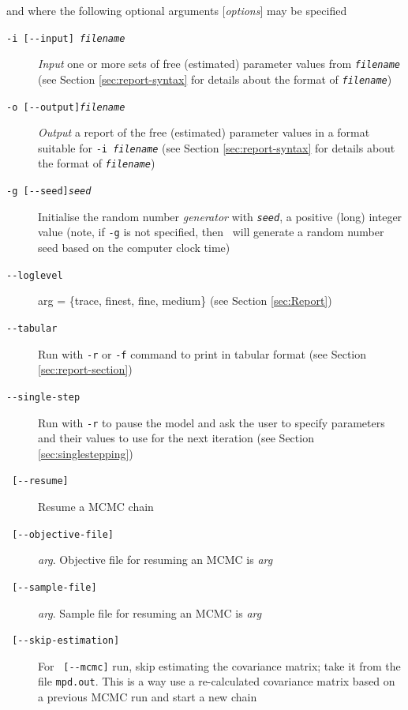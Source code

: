 and where the following optional arguments [\emph{options}] may be specified

\begin{description}
\item [\texttt{-i [-{}-input] \emph{filename}}] \emph{Input} one or more sets of free (estimated) parameter values from \texttt{\emph{filename}} (see Section \ref{sec:report-syntax} for details about the format of \texttt{\emph{filename}})

\item [\texttt{-o [-{}-output]\emph{filename}}] \emph{Output} a report of the free (estimated) parameter values in a format suitable for \texttt{-i \emph{filename}} (see Section \ref{sec:report-syntax} for details about the format of \texttt{\emph{filename}})

\item [\texttt{-g [-{}-seed]\emph{seed}}] Initialise the random number \emph{generator} with \texttt{\emph{seed}}, a positive (long) integer value (note, if \texttt{-g} is not specified, then \CNAME\ will generate a random number seed based on the computer clock time)

\item [\texttt{-{}-loglevel}] arg = \{trace, finest, fine, medium\} (see Section \ref{sec:Report})

\item [\texttt{-{}-tabular}] Run with \texttt{-r} or \texttt{-f} command to print  in tabular format (see Section \ref{sec:report-section})

\item [\texttt{-{}-single-step}] Run with \texttt{-r} to pause the model and ask the user to specify parameters and their values to use for the next iteration (see Section \ref{sec:singlestepping})

\item [\texttt{ [-{}-resume] }] Resume a MCMC chain

\item [\texttt{ [-{}-objective-file] }] \emph{arg}. Objective file for resuming an MCMC is \emph{arg}

\item [\texttt{ [-{}-sample-file] }] \emph{arg}. Sample file for resuming an MCMC is \emph{arg}

\item [\texttt{ [-{}-skip-estimation] }] For \texttt{ [-{}-mcmc]} run, skip estimating the covariance matrix; take it from the file \texttt{mpd.out}. This is a way use a re-calculated covariance matrix based on a previous MCMC run and start a new chain


\end{description}
